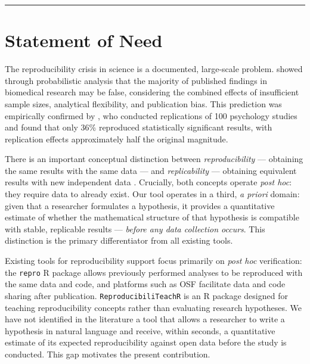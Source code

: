 \documentclass[12pt,a4paper]{article}
\begin{document}
\vspace{10pt}
\hrule
\vspace{10pt}

\section{Statement of Need}

The reproducibility crisis in science is a documented, large-scale problem.
\textcite{ioannidis2005} showed through probabilistic analysis that the majority of
published findings in biomedical research may be false, considering the combined
effects of insufficient sample sizes, analytical flexibility, and publication
bias. This prediction was empirically confirmed by \textcite{osc2015}, who conducted
replications of 100 psychology studies and found that only 36\% reproduced
statistically significant results, with replication effects approximately half
the original magnitude.

There is an important conceptual distinction between \textit{reproducibility} --- obtaining
the same results with the same data --- and \textit{replicability} --- obtaining equivalent
results with new independent data \parencite{goodman2016}. Crucially, both concepts
operate \textit{post hoc}: they require data to already exist. Our tool operates in a
third, \textit{a priori} domain: given that a researcher formulates a hypothesis, it
provides a quantitative estimate of whether the mathematical structure of that
hypothesis is compatible with stable, replicable results --- \textit{before any data
collection occurs}. This distinction is the primary differentiator from all
existing tools.

Existing tools for reproducibility support focus primarily on \textit{post hoc}
verification: the \texttt{repro} R package \parencite{repro2021} allows previously performed
analyses to be reproduced with the same data and code, and platforms such as
OSF \parencite{osf2013} facilitate data and code sharing after publication.
\texttt{ReproducibiliTeachR} is an R package designed for teaching reproducibility
concepts rather than evaluating research hypotheses.
We have not identified in the literature a tool that allows a researcher to write
a hypothesis in natural language and receive, within seconds, a quantitative
estimate of its expected reproducibility against open data before the study is
conducted. This gap motivates the present contribution.
\end{document}
